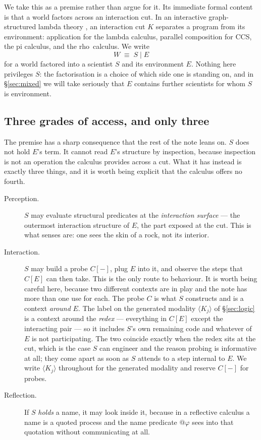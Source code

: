 \documentclass[11pt]{article}
\theoremstyle{plain}
\theoremstyle{definition}
\newcommand{\rhoc}{\textsf{rho}}
\begin{document}
We take this as a premise rather than argue for it. Its immediate formal content is that a world
factors across an interaction cut. In an interactive graph-structured lambda theory \cite{Omnibus},
an interaction cut $K$ separates a program from its environment: application for the lambda calculus,
parallel composition for CCS, the pi calculus, and the \rhoc\ calculus. We write
\[
W \;\equiv\; S \mid E
\]
for a world factored into a scientist $S$ and its environment $E$. Nothing here privileges $S$: the
factorisation is a choice of which side one is standing on, and in \S\ref{sec:mixed} we will take
seriously that $E$ contains further scientists for whom $S$ is environment.

\subsection{Three grades of access, and only three}

The premise has a sharp consequence that the rest of the note leans on. $S$ does not hold $E$'s term.
It cannot read $E$'s structure by inspection, because inspection is not an operation the calculus
provides across a cut. What it has instead is exactly three things, and it is worth being explicit
that the calculus offers no fourth.

\begin{description}
\item[Perception.] $S$ may evaluate structural predicates at the \emph{interaction surface} --- the
outermost interaction structure of $E$, the part exposed at the cut. This is what senses are: one
sees the skin of a rock, not its interior.
\item[Interaction.] $S$ may build a probe $C[-]$, plug $E$ into it, and observe the steps that
$C[E]$ can then take. This is the only route to behaviour. It is worth being careful here, because
two different contexts are in play and the note has more than one use for each. The probe $C$ is
what $S$ constructs and is a context \emph{around} $E$. The label on the generated modality
$\langle K_j \rangle$ of \S\ref{sec:logic} is a context around the \emph{redex} --- everything in
$C[E]$ except the interacting pair --- so it includes $S$'s own remaining code and whatever of $E$
is not participating. The two coincide exactly when the redex sits at the cut, which is the case
$S$ can engineer and the reason probing is informative at all; they come apart as soon as $S$
attends to a step internal to $E$. We write $\langle K_j \rangle$ throughout for the generated
modality and reserve $C[-]$ for probes.
\item[Reflection.] If $S$ \emph{holds} a name, it may look inside it, because in a reflective calculus
a name is a quoted process and the name predicate $@\varphi$ sees into that quotation without
communicating at all.
\end{description}
\end{document}
